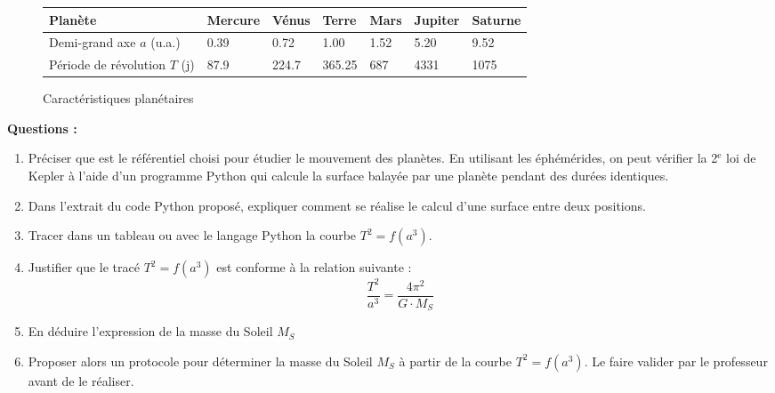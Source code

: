 \documentclass[a4paper,11pt,fleqn]{article}%
\begin{document}
\begin{figure}[h!]
	\caption{ Caractéristiques planétaires}
	\begin{tabular}{|>{\centering}m{2.5cm}|>{\centering}m{2cm}|>{\centering}m{2cm}|>{\centering}m{2cm}|>{\centering}m{2cm}|>{\centering}m{2cm}|>{\centering\arraybackslash}m{2cm}|}
		\hline Planète & Mercure & Vénus & Terre & Mars & Jupiter & Saturne\\
		\hline Demi-grand axe $a$ (u.a.) & \num{0,39} & \num{0,72} & \num{1,00} & \num{1,52} & \num{5,20} & \num{9,52}\\
		\hline Période de révolution $T$ (j) & \num{87,9} & \num{224,7} & \num{365,25} & \num{687} & \num{4331} & \num{1075}\\
		\hline
		\end{tabular}
\end{figure}

\textbf{Questions :}
\begin{enumerate}
	\item Préciser que est le référentiel choisi pour étudier le mouvement des planètes. En utilisant les éphémérides, on peut vérifier la 2$^\text{e}$ loi de Kepler à l'aide d'un programme Python qui calcule la surface balayée par une planète pendant des durées identiques.
	\item Dans l'extrait du code Python proposé, expliquer comment se réalise le calcul d'une surface entre deux positions.
	\item Tracer dans un tableau ou avec le langage Python la courbe $T^2=f(a^3)$.
	\item Justifier que le tracé $T^2=f(a^3)$ est conforme à la relation suivante :
	$$\dfrac{T^2}{a^3}=\dfrac{4 \pi ^2}{G \cdot M_S}$$
	\item En déduire l'expression de la masse du Soleil $M_S$
	\item Proposer alors un protocole pour déterminer la masse du Soleil $M_S$ à partir de la courbe $T^2=f(a^3)$. Le faire valider par le professeur avant de le réaliser.
\end{enumerate}
\end{document}
